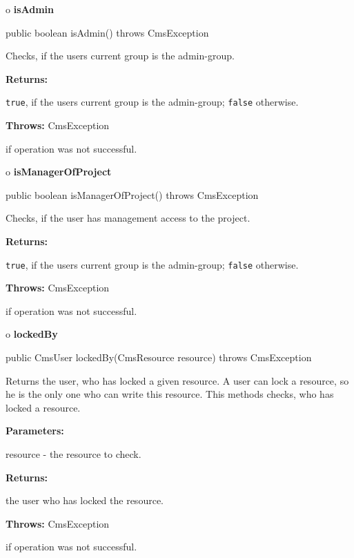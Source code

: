 o {\bf isAdmin} 

\begin{PRE}
 public boolean isAdmin() throws CmsException
\end{PRE}

\begin{description}
\htmlDD Checks, if the users current group is the admin-group. 

\begin{description}
\item {\bf Returns:}  

{\tt true}, if the users current group is the admin-group; {\tt false}
otherwise.  
\item {\bf Throws:} CmsException  

if operation was not successful.  
\end{description}

\end{description}

o {\bf isManagerOfProject} 

\begin{PRE}
 public boolean isManagerOfProject() throws CmsException
\end{PRE}

\begin{description}
\htmlDD Checks, if the user has management access to the project. 

\begin{description}
\item {\bf Returns:}  

{\tt true}, if the users current group is the admin-group; {\tt false}
otherwise.  
\item {\bf Throws:} CmsException  

if operation was not successful.  
\end{description}

\end{description}

o {\bf lockedBy} 

\begin{PRE}
 public CmsUser lockedBy(CmsResource resource) throws CmsException
\end{PRE}

\begin{description}
\htmlDD Returns the user, who has locked a given resource. \htmlBR
A user can lock a resource, so he is the only one who can write this resource.
This methods checks, who has locked a resource. 

\begin{description}
\item {\bf Parameters:}  

resource - the resource to check.  
\item {\bf Returns:}  

the user who has locked the resource.  
\item {\bf Throws:} CmsException  

if operation was not successful.  
\end{description}

\end{description}

